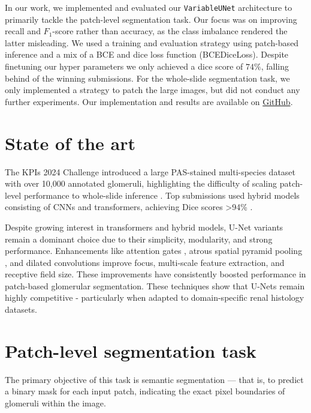 \documentclass[12pt]{article}
\begin{document}
In our work, we implemented and evaluated our \texttt{VariableUNet} architecture to primarily tackle the patch-level segmentation task. Our focus was on improving recall and $F_1$-score rather than accuracy, as the class imbalance rendered the latter misleading. We used a training and evaluation strategy using patch-based inference and a mix of a BCE and dice loss function (BCEDiceLoss). Despite finetuning our hyper parameters we only achieved a dice score of $74\%$, falling behind of the winning submissions. For the whole-slide segmentation task, we only implemented a strategy to patch the large images, but did not conduct any further experiments. Our implementation and results are available on \href{https://github.com/LScheib/cv25-glom-segmentation-from-wsis}{GitHub}.

\section{State of the art}

The KPIs 2024 Challenge introduced a large PAS-stained multi-species dataset with over 10,000 annotated glomeruli, highlighting the difficulty of scaling patch-level performance to whole-slide inference \cite{Deng.11.02.2025}. Top submissions used hybrid models consisting of CNNs and transformers, achieving Dice scores >94\% \cite{Deng.11.02.2025}.

Despite growing interest in transformers and hybrid models, U-Net variants remain a dominant choice due to their simplicity, modularity, and strong performance. Enhancements like attention gates \cite{Oktay.11.04.2018}, atrous spatial pyramid pooling \cite{Kim.26.07.2023}, and dilated convolutions \cite{Wang.07.04.2020} improve focus, multi-scale feature extraction, and receptive field size. These improvements have consistently boosted performance in patch-based glomerular segmentation. These techniques show that U-Nets remain highly competitive - particularly when adapted to domain-specific renal histology datasets.

\section{Patch-level segmentation task}
The primary objective of this task is semantic segmentation — that is, to predict a binary mask for each input patch, indicating the exact pixel boundaries of glomeruli within the image.
\end{document}
